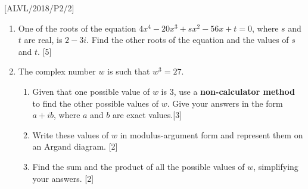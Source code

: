 \item {[}ALVL/2018/P2/2{]}
\begin{enumerate}
\item One of the roots of the equation $4x^{4}-20x^{3}+sx^{2}-56x+t=0$,
where $s$ and $t$ are real, is $2-3i$. Find the other roots of
the equation and the values of $s$ and $t$. {[}5{]} 
\item The complex number $w$ is such that $w^{3}=27$. 
\begin{enumerate}
\item Given that one possible value of $w$ is 3, use a \textbf{non-calculator
method} to find the other possible values of $w$. Give your answers
in the form $a+ib$, where $a$ and $b$ are exact values.\hfill{}{[}3{]}
\item Write these values of $w$ in modulus-argument form and represent
them on an Argand diagram. \hfill{}{[}2{]}
\item Find the sum and the product of all the possible values of $w$, simplifying
your answers.\hfill{} {[}2{]}
\end{enumerate}
\end{enumerate}
